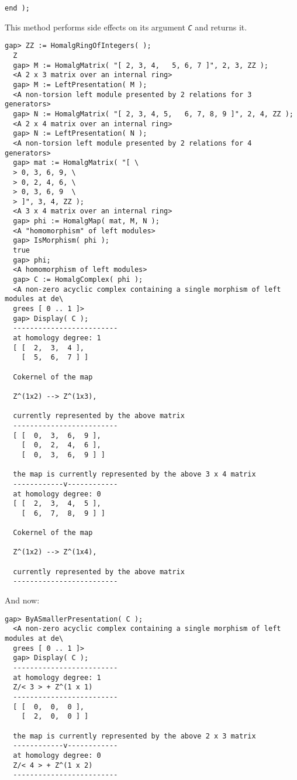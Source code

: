 \documentclass[a4paper,11pt]{report}
\begin{document}
{{{\begin{Verbatim}[fontsize=\small,frame=single,label=Code]
  end );
\end{Verbatim}
 This method performs side effects on its argument \mbox{\texttt{\slshape C}} and returns it. 
\begin{Verbatim}[fontsize=\small,frame=single,label=Example]
  gap> ZZ := HomalgRingOfIntegers( );
  Z
  gap> M := HomalgMatrix( "[ 2, 3, 4,   5, 6, 7 ]", 2, 3, ZZ );
  <A 2 x 3 matrix over an internal ring>
  gap> M := LeftPresentation( M );
  <A non-torsion left module presented by 2 relations for 3 generators>
  gap> N := HomalgMatrix( "[ 2, 3, 4, 5,   6, 7, 8, 9 ]", 2, 4, ZZ );
  <A 2 x 4 matrix over an internal ring>
  gap> N := LeftPresentation( N );
  <A non-torsion left module presented by 2 relations for 4 generators>
  gap> mat := HomalgMatrix( "[ \
  > 0, 3, 6, 9, \
  > 0, 2, 4, 6, \
  > 0, 3, 6, 9  \
  > ]", 3, 4, ZZ );
  <A 3 x 4 matrix over an internal ring>
  gap> phi := HomalgMap( mat, M, N );
  <A "homomorphism" of left modules>
  gap> IsMorphism( phi );
  true
  gap> phi;
  <A homomorphism of left modules>
  gap> C := HomalgComplex( phi );
  <A non-zero acyclic complex containing a single morphism of left modules at de\
  grees [ 0 .. 1 ]>
  gap> Display( C );
  -------------------------
  at homology degree: 1
  [ [  2,  3,  4 ],
    [  5,  6,  7 ] ]
  
  Cokernel of the map
  
  Z^(1x2) --> Z^(1x3),
  
  currently represented by the above matrix
  -------------------------
  [ [  0,  3,  6,  9 ],
    [  0,  2,  4,  6 ],
    [  0,  3,  6,  9 ] ]
  
  the map is currently represented by the above 3 x 4 matrix
  ------------v------------
  at homology degree: 0
  [ [  2,  3,  4,  5 ],
    [  6,  7,  8,  9 ] ]
  
  Cokernel of the map
  
  Z^(1x2) --> Z^(1x4),
  
  currently represented by the above matrix
  -------------------------
\end{Verbatim}
 And now: 
\begin{Verbatim}[fontsize=\small,frame=single,label=Example]
  gap> ByASmallerPresentation( C );
  <A non-zero acyclic complex containing a single morphism of left modules at de\
  grees [ 0 .. 1 ]>
  gap> Display( C );
  -------------------------
  at homology degree: 1
  Z/< 3 > + Z^(1 x 1)
  -------------------------
  [ [  0,  0,  0 ],
    [  2,  0,  0 ] ]
  
  the map is currently represented by the above 2 x 3 matrix
  ------------v------------
  at homology degree: 0
  Z/< 4 > + Z^(1 x 2)
  -------------------------
\end{Verbatim}
 }

 }

  }
\end{document}
